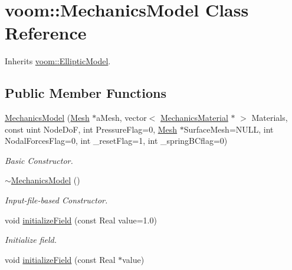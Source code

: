 \hypertarget{classvoom_1_1_mechanics_model}{
\section{voom::MechanicsModel Class Reference}
\label{classvoom_1_1_mechanics_model}
}


Inherits \hyperlink{classvoom_1_1_elliptic_model}{voom::EllipticModel}.\subsection*{Public Member Functions}
\begin{DoxyCompactItemize}
\item 
\hyperlink{classvoom_1_1_mechanics_model_a8b24dd67f8e395576c7d90ee9faf373c}{MechanicsModel} (\hyperlink{classvoom_1_1_mesh}{Mesh} $\ast$aMesh, vector$<$ \hyperlink{classvoom_1_1_mechanics_material}{MechanicsMaterial} $\ast$ $>$ Materials, const uint NodeDoF, int PressureFlag=0, \hyperlink{classvoom_1_1_mesh}{Mesh} $\ast$SurfaceMesh=NULL, int NodalForcesFlag=0, int \_\-resetFlag=1, int \_\-springBCflag=0)
\begin{DoxyCompactList}\small\item\em Basic Constructor. \item\end{DoxyCompactList}\item 
\hyperlink{classvoom_1_1_mechanics_model_a39cab4fab5f26d8bf83e63a6d91e33f6}{$\sim$MechanicsModel} ()
\begin{DoxyCompactList}\small\item\em Input-\/file-\/based Constructor. \item\end{DoxyCompactList}\item 
\hypertarget{classvoom_1_1_mechanics_model_a5315460244606255a586557fcd8d3020}{
void \hyperlink{classvoom_1_1_mechanics_model_a5315460244606255a586557fcd8d3020}{initializeField} (const Real value=1.0)}
\label{classvoom_1_1_mechanics_model_a5315460244606255a586557fcd8d3020}

\begin{DoxyCompactList}\small\item\em Initialize field. \item\end{DoxyCompactList}\item 
\hypertarget{classvoom_1_1_mechanics_model_a00dcb774c75d337aea3a3396d2ce15f5}{
void \hyperlink{classvoom_1_1_mechanics_model_a00dcb774c75d337aea3a3396d2ce15f5}{initializeField} (const Real $\ast$value)}
\label{classvoom_1_1_mechanics_model_a00dcb774c75d337aea3a3396d2ce15f5}


\end{DoxyCompactItemize}
